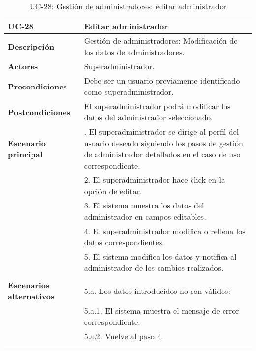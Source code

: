 \begin{table}[H]
  \begin{center}
    \begin{tabularx}{16.4cm}{|l|X|}
      \hline
      \textbf{UC-28} & \textbf{Editar administrador}\\
      \hline
      \textbf{Descripción} & Gestión de administradores: Modificación de los datos de administradores.\\
      \hline
      \textbf{Actores} & Superadministrador.\\
      \hline
      \textbf{Precondiciones} & Debe ser un usuario previamente identificado como superadministrador.\\
      \hline
      \textbf{Postcondiciones} & El superadministrador podrá modificar los datos del administrador seleccionado.\\
      \hline
      \textbf{Escenario principal} & \smallskip 1. El superadministrador se dirige al perfil del usuario deseado siguiendo los pasos de gestión de administrador detallados en el caso de uso correspondiente.\\
      & 2. El superadministrador hace click en la opción de editar. \\
      & 3. El sistema muestra los datos del administrador en campos editables.\\
      & 4. El superadministrador modifica o rellena los datos correspondientes.\\
      & 5. El sistema modifica los datos y notifica al administrador de los cambios realizados.\\ 
      & \\
      \hline
      \textbf{Escenarios alternativos} & \smallskip 5.a. Los datos introducidos no son válidos:\\
      & \hspace{0.3cm} 5.a.1. El sistema muestra el mensaje de error correspondiente.\\
      & \hspace{0.3cm} 5.a.2. Vuelve al paso 4.\\
      & \\
      \hline
    \end{tabularx}
    \caption{UC-28: Gestión de administradores: editar administrador}
  \end{center}
\end{table}


